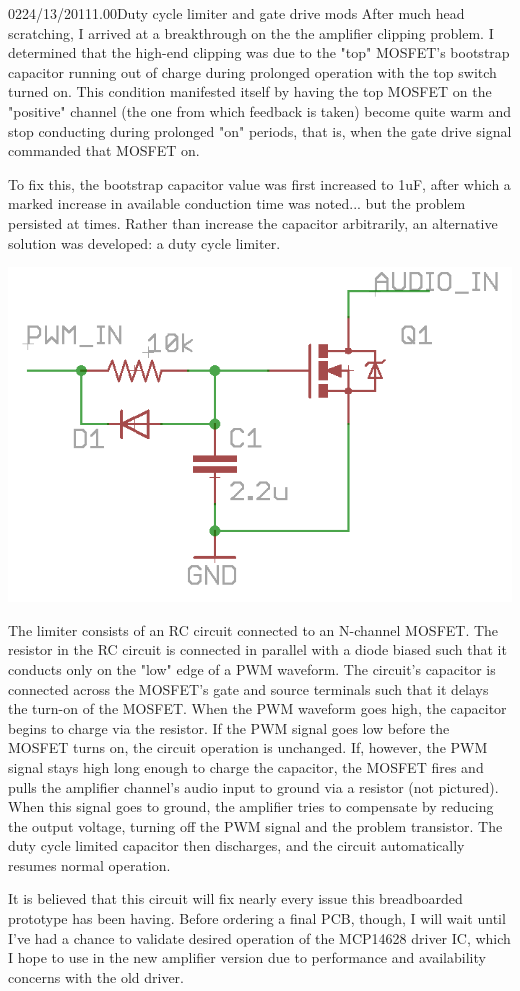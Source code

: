\documentclass[12pt,letterpaper,onecolumn]{article}
\begin{document}
\begin{nbentry}{022}{4/13/2011}{1.00}{Duty cycle limiter and gate drive mods}
After much head scratching, I arrived at a breakthrough on the the amplifier clipping problem.  I determined that the high-end clipping was due to the "top" MOSFET's bootstrap capacitor running out of charge during prolonged operation with the top switch turned on.  This condition manifested itself by having the top MOSFET on the "positive" channel (the one from which feedback is taken) become quite warm and stop conducting during prolonged "on" periods, that is, when the gate drive signal commanded that MOSFET on.

To fix this, the bootstrap capacitor value was first increased to 1uF, after which a marked increase in available conduction time was noted... but the problem persisted at times.  Rather than increase the capacitor arbitrarily, an alternative solution was developed:  a duty cycle limiter.

\includegraphics{img/dcl.png}

The limiter consists of an RC circuit connected to an N-channel MOSFET.  The resistor in the RC circuit is connected in parallel with a diode biased such that it conducts only on the "low" edge of a PWM waveform.  The circuit's capacitor is connected across the MOSFET's gate and source terminals such that it delays the turn-on of the MOSFET.  When the PWM waveform goes high, the capacitor begins to charge via the resistor.  If the PWM signal goes low before the MOSFET turns on, the circuit operation is unchanged.  If, however, the PWM signal stays high long enough to charge the capacitor, the MOSFET fires and pulls the amplifier channel's audio input to ground via a resistor (not pictured).  When this signal goes to ground, the amplifier tries to compensate by reducing the output voltage, turning off the PWM signal and the problem transistor.  The duty cycle limited capacitor then discharges, and the circuit automatically resumes normal operation.

It is believed that this circuit will fix nearly every issue this breadboarded prototype has been having.  Before ordering a final PCB, though, I will wait until I've had a chance to validate desired operation of the MCP14628 driver IC, which I hope to use in the new amplifier version due to performance and availability concerns with the old driver.
\end{nbentry}
\end{document}
